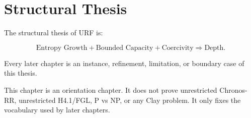 \section{Structural Thesis}

The structural thesis of URF is:

\[
\text{Entropy Growth}
+
\text{Bounded Capacity}
+
\text{Coercivity}
\Longrightarrow
\text{Depth}.
\]

Every later chapter is an instance, refinement, limitation, or boundary case
of this thesis.

\begin{remark}[Boundary]
This chapter is an orientation chapter. It does not prove unrestricted
Chronos-RR, unrestricted H4.1/FGL, P vs NP, or any Clay problem. It only fixes
the vocabulary used by later chapters.
\end{remark}
